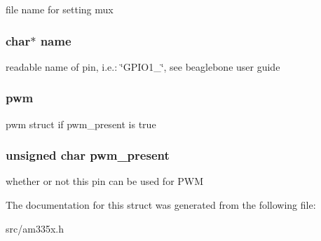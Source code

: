 file name for setting mux \hypertarget{structs___p_i_n_a5ac083a645d964373f022d03df4849c8}{
\subsubsection[{name}]{\setlength{\rightskip}{0pt plus 5cm}char$\ast$ name}}\label{structs___p_i_n_a5ac083a645d964373f022d03df4849c8}
readable name of pin, i.\-e.\-: \char`\"{}\-G\-P\-I\-O1\-\_\char`\"{}, see beaglebone user guide \hypertarget{structs___p_i_n_a6208909b76c84a75b931c78e24a0cc42}{
\subsubsection[{pwm}]{ pwm}}\label{structs___p_i_n_a6208909b76c84a75b931c78e24a0cc42}
pwm struct if pwm\-\_\-present is true \hypertarget{structs___p_i_n_ad9d4ffb703dd541884e772f4490febd9}{
\subsubsection[{pwm\-\_\-present}]{\setlength{\rightskip}{0pt plus 5cm}unsigned char pwm\-\_\-present}}\label{structs___p_i_n_ad9d4ffb703dd541884e772f4490febd9}
whether or not this pin can be used for P\-W\-M 

The documentation for this struct was generated from the following file\-:\begin{DoxyCompactItemize}
\item 
src/am335x.\-h\end{DoxyCompactItemize}
